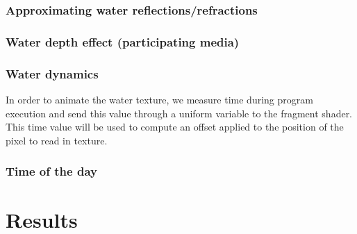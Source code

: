 \documentclass[a4paper,11pt]{article}
\begin{document}
\subsubsection{Approximating water reflections/refractions}

\subsubsection{Water depth effect (participating media)}

\subsubsection{Water dynamics}
In order to animate the water texture, we measure time during program execution and send this value through a uniform variable to the fragment shader. This time value will be used to compute an offset applied to the position of the pixel to read in texture.
\subsubsection{Time of the day}


\section{Results}
\end{document}
